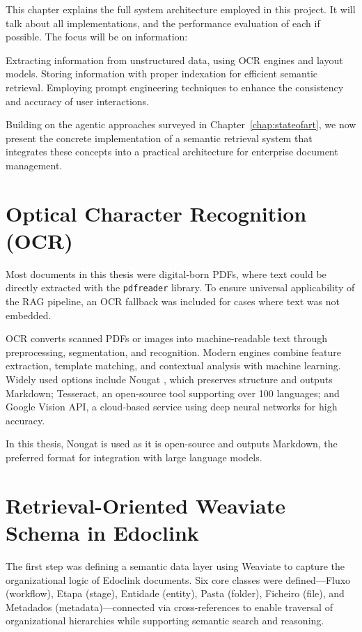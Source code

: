 \label{chap:systemarch}
This chapter explains the full system architecture employed in this project. It will talk about all implementations, and the performance evaluation of each if possible. The focus will be on information:

Extracting information from unstructured data, using OCR engines and layout models.
Storing information with proper indexation for efficient semantic retrieval.
Employing prompt engineering techniques to enhance the consistency and accuracy of user interactions.

Building on the agentic approaches surveyed in Chapter~\ref{chap:stateofart}, we now present the concrete implementation of a semantic retrieval system that integrates these concepts into a practical architecture for enterprise document management.

\section{Optical Character Recognition (OCR)}\label{sec:ocr}
Most documents in this thesis were digital-born PDFs, where text could be directly extracted with the \texttt{pdfreader} library. To ensure universal applicability of the \gls{RAG} pipeline, an \gls{OCR} fallback was included for cases where text was not embedded. 

OCR converts scanned PDFs or images into machine-readable text through preprocessing, segmentation, and recognition. Modern engines combine feature extraction, template matching, and contextual analysis with machine learning. Widely used options include Nougat \cite{blecher2023nougatneuralopticalunderstanding}, which preserves structure and outputs Markdown; Tesseract, an open-source tool supporting over 100 languages; and Google Vision API, a cloud-based service using deep neural networks for high accuracy.

In this thesis, Nougat is used as it is open-source and outputs Markdown, the preferred format for integration with large language models.

\section{Retrieval-Oriented Weaviate Schema in Edoclink}\label{sec:schema}

The first step was defining a semantic data layer using Weaviate to capture the organizational logic of Edoclink documents. Six core classes were defined—Fluxo (workflow), Etapa (stage), Entidade (entity), Pasta (folder), Ficheiro (file), and Metadados (metadata)—connected via cross-references to enable traversal of organizational hierarchies while supporting semantic search and reasoning.

